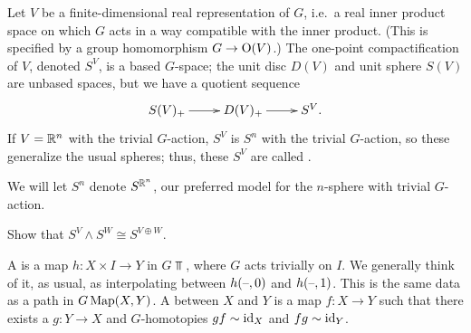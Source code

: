 \begin{exm}
Let $V$ be a finite-dimensional real representation of $G$, i.e.\ a real inner product space on which $G$ acts in a
way compatible with the inner product. (This is specified by a group homomorphism $G\to\mathrm O(V)$.) The one-point
compactification of $V$, denoted $S^V$, is a based $G$-space; the unit disc $D(V)$ and unit sphere $S(V)$ are
unbased spaces, but we have a quotient sequence
\[\xymatrix{
	S(V)_+\ar[r] & D(V)_+\ar[r] & S^V.
}\]
If $V = \mathbb R^n$ with the trivial $G$-action, $S^V$ is $S^n$ with the trivial $G$-action, so these generalize the
usual spheres; thus, these $S^V$ are called .
\end{exm}
We will let $S^n$ denote $S^{\mathbb R^n}$, our preferred model for the $n$-sphere with trivial $G$-action.
\begin{ex}
Show that $S^V\wedge S^W\cong S^{V\oplus W}$.
\end{ex}
\begin{defn}
A  is a map $h\colon X\times I\to Y$ in $G\Top$, where $G$ acts trivially on $I$. We generally
think of it, as usual, as interpolating between $h(\text{--}, 0)$ and $h(\text{--}, 1)$. This is the same data as a path in
$G\operatorname{Map}(X,Y)$. A  between $X$ and $Y$ is a map $f\colon X\to Y$ such that there
exists a $g\colon Y\to X$ and $G$-homotopies $gf\sim \mathrm{id}_X$ and $fg\sim\mathrm{id}_Y$.
\end{defn}

